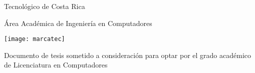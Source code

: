 
\thispagestyle{empty} 

\begin{center}

Tecnológico de Costa Rica

\par\vspace{1ex}

\'Area Acad\'emica de Ingeniería en Computadores 

\par\vspace{20mm}

\texttt{[image: marcatec]}

\par\vspace*{\fill}

{\large\bf{\scriptTitle}}

\par\vspace*{\fill}

Documento de tesis sometido a consideración para optar por el grado
académico de Licenciatura en Computadores
%

\par\vspace{20mm}

\scriptAuthor

\vspace*{\fill}

\end{center}
\newpage 
\cleardoublepage 


